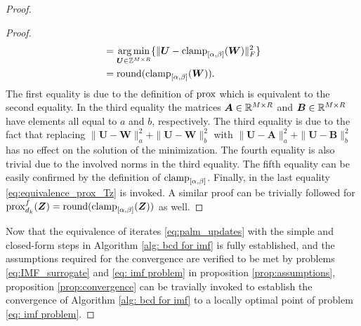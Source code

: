 \begin{proof}
\begin{proof}
\begin{align*}
            &= \operatorname*{arg\,min}_{\bm U \in \mathbb Z^{M\times R}}\{\|\bm U - \operatorname{clamp}_{[\alpha,\beta]}(\bm W)\|^2_F\}\\
            &= \operatorname{round}(\operatorname{clamp}_{[\alpha,\beta]}(\bm W)).
        \end{align*}
        The first equality is due to the definition of $\operatorname{prox}$ which is equivalent to the second equality. 
        In the third equality the matrices $\bm A\in\mathbb{R}^{M\times R}$ and $\bm B\in\mathbb{R}^{M\times R}$ have elements all equal to $a$ and $b$, respectively.
        The third equality is due to the fact that replacing $\|\bm U - \bm W\|^2_a + \|\bm U - \bm W\|^2_b$ with $\|\bm U - \bm A\|^2_a + \|\bm U - \bm B\|^2_b$ has no effect on the solution of the minimization. The fourth equality is also trivial due to the involved norms in the third equality. The fifth equality can be easily confirmed by the definition of $\operatorname{clamp}_{[\alpha,\beta]}$. Finally, in the last equality \eqref{eq:equivalence_prox_Tz} is invoked. A similar proof can be trivially followed for $\operatorname{prox}^f_{d_k}(\bm Z) = \operatorname{round}(\operatorname{clamp}_{[\alpha,\beta]}(\bm Z))$ as well.
    \end{proof}
    Now that the equivalence of iterates \eqref{eq:palm_updates} with the simple and closed-form steps in Algorithm \ref{alg: bcd for imf} is fully established, and the assumptions required for the convergence are verified to be met by problems \eqref{eq:IMF_surrogate} and \eqref{eq: imf problem} in proposition \ref{prop:assumptions}, proposition \ref{prop:convergence} can be travially invoked to establish the convergence of Algorithm \ref{alg: bcd for imf} to a locally optimal point of problem \eqref{eq: imf problem}.
\end{proof}